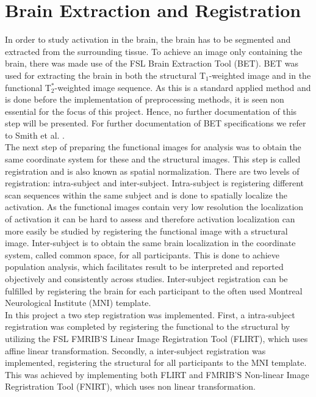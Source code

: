 \section{Brain Extraction and Registration} \label{BET}

In order to study activation in the brain, the brain has to be segmented and extracted from the surrounding tissue. To achieve an image only containing the brain, there was made use of the FSL Brain Extraction Tool (BET).  BET was used for extracting the brain in both the structural T$_1$-weighted image and in the functional T$_{2}^*$-weighted image sequence. As this is a standard applied method and is done before the implementation of preprocessing methods, it is seen non essential for the focus of this project. Hence, no further documentation of this step will be presented. For further documentation of BET specifications we refer to Smith et al. \cite{Smith2002}.    \\
The next step of preparing the functional images for analysis was to obtain the same coordinate system for these and the structural images. This step is called registration and is also known as spatial normalization. There are two levels of registration: intra-subject and inter-subject. Intra-subject is registering different scan sequences within the same subject and is done to spatially localize the activation. As the functional images contain very low resolution the localization of activation it can be hard to assess and therefore activation localization can more easily be studied by registering the functional image with a structural image. Inter-subject is to obtain the same brain localization in the coordinate system, called common space, for all participants. This is done to achieve population analysis, which facilitates result to be interpreted and reported objectively and consistently across studies. Inter-subject registration can be fulfilled by registering the brain for each participant to the often used Montreal Neurological Institute (MNI) template. \cite{Hajnal2001} \\
In this project a two step registration was implemented. First, a intra-subject registration was completed by registering the functional to the structural by utilizing the FSL FMRIB'S Linear Image Registration Tool (FLIRT), which uses affine linear transformation. \cite{Jenkinson2001} Secondly, a inter-subject registration was implemented, registering the structural for all participants to the MNI template. This was achieved by implementing both FLIRT and FMRIB'S Non-linear Image Regristration Tool (FNIRT), which uses non linear transformation. \cite{Andersson2007}   


